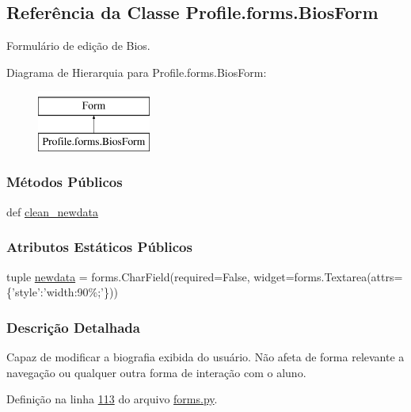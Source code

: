 \hypertarget{classProfile_1_1forms_1_1BiosForm}{\subsection{Referência da Classe Profile.\-forms.\-Bios\-Form}
\label{classProfile_1_1forms_1_1BiosForm}
}


Formulário de edição de Bios.  


Diagrama de Hierarquia para Profile.\-forms.\-Bios\-Form\-:\begin{figure}[H]
\begin{center}
\leavevmode
\includegraphics[height=2.000000cm]{d7/d1e/classProfile_1_1forms_1_1BiosForm}
\end{center}
\end{figure}
\subsubsection*{Métodos Públicos}
\begin{DoxyCompactItemize}
\item 
def \hyperlink{classProfile_1_1forms_1_1BiosForm_a10f21ed8d7cb888f0aa35618087c86af}{clean\-\_\-newdata}
\end{DoxyCompactItemize}
\subsubsection*{Atributos Estáticos Públicos}
\begin{DoxyCompactItemize}
\item 
tuple \hyperlink{classProfile_1_1forms_1_1BiosForm_a2862b20c24bac9aa5dc896925a2cb3d6}{newdata} = forms.\-Char\-Field(required=False, widget=forms.\-Textarea(attrs=\{'style'\-:'width\-:90\%;'\}))
\end{DoxyCompactItemize}


\subsubsection{Descrição Detalhada}
Capaz de modificar a biografia exibida do usuário. Não afeta de forma relevante a navegação ou qualquer outra forma de interação com o aluno. 

Definição na linha \hyperlink{Profile_2forms_8py_source_l00113}{113} do arquivo \hyperlink{Profile_2forms_8py_source}{forms.\-py}.



